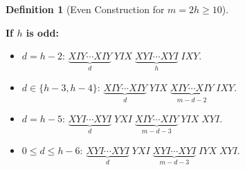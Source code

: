 \documentclass[11pt]{article}
\theoremstyle{definition}
\newtheorem{definition}[theorem]{Definition}
\theoremstyle{remark}
\begin{document}
\begin{definition}[Even Construction for $m = 2h \geq 10$]
\begin{enumerate}[label=(\alph*)]
    \textbf{If $h$ is odd:}
    \begin{itemize}
        \item $d = h-2$: $\underbrace{XIY \cdots XIY}_{d} \; YIX \; \underbrace{XYI \cdots XYI}_{h} \; IXY$.
        \item $d \in \{h-3, h-4\}$: $\underbrace{XIY \cdots XIY}_{d} \; YIX \; \underbrace{XIY \cdots XIY}_{m-d-2} \; IXY$.
        \item $d = h-5$: $\underbrace{XYI \cdots XYI}_{d} \; YXI \; \underbrace{XIY \cdots XIY}_{m-d-3} \; YIX \; XYI$.
        \item $0 \leq d \leq h-6$: $\underbrace{XYI \cdots XYI}_{d} \; YXI \; \underbrace{XYI \cdots XYI}_{m-d-3} \; IYX \; XYI$.
    \end{itemize}
\end{enumerate}
\end{definition}
\end{document}
